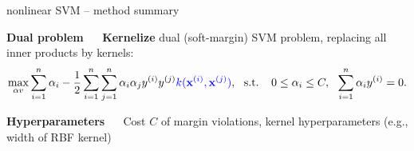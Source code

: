 \documentclass[11pt,compress,t,notes=noshow, xcolor=table]{beamer}
\newcommand{\highlight}[1]{\textcolor{hlcol}{\textbf{#1}}}
\begin{document}
\begin{frame2}{nonlinear SVM -- method summary}
  \framebreak

  \footnotesize

\highlight{Dual problem} ~~ \textbf{Kernelize} dual (soft-margin) SVM problem, 
replacing all inner products by kernels:
$$\max_{\alpha v} \sumin \alpha_i - \frac{1}{2}\sumin \sumjn
\alpha_i\alpha_j\yi y^{(j)} \textcolor{blue}{k(\xi, \xi[j])}, ~~ \text{s.t. } ~~ 
0 \le \alpha_i \le C, ~~ \sumin \alpha_i \yi = 0.
$$

\medskip

\highlight{Hyperparameters} ~~ Cost $C$ of margin violations, kernel 
hyperparameters (e.g., width of RBF kernel)

\medskip

\begin{columns}[T, totalwidth=\textwidth]
    \begin{column}{0.59\textwidth}
        

\end{column}
\end{columns}
\end{frame2}
\end{document}
